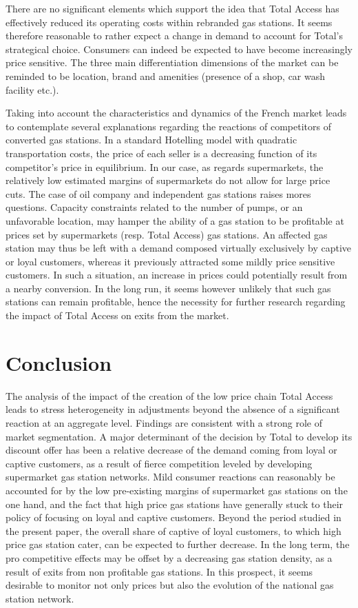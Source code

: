 \documentclass[english]{article}
\begin{document}
There are no significant elements which support the idea that Total Access has effectively reduced its operating costs within rebranded gas stations. It seems therefore reasonable to rather expect a change in demand to account for Total's strategical choice. Consumers can indeed be expected to have become increasingly price sensitive. The three main differentiation dimensions of the market can be reminded to be location, brand and amenities (presence of a shop, car wash facility etc.).

Taking into account the characteristics and dynamics of the French market leads to contemplate several explanations regarding the reactions of competitors of converted gas stations. In a standard Hotelling model with quadratic transportation costs, the price of each seller is a decreasing function of its competitor's price in equilibrium. In our case, as regards supermarkets, the relatively low estimated margins of supermarkets do not allow for large price cuts. The case of oil company and independent gas stations raises mores questions. Capacity constraints related to the number of pumps, or an unfavorable location, may hamper the ability of a gas station to be profitable at prices set by supermarkets (resp. Total Access) gas stations. An affected gas station may thus be left with a demand composed virtually exclusively by captive or loyal customers, whereas it previously attracted some mildly price sensitive customers. In such a situation, an increase in prices could potentially result from a nearby conversion. In the long run, it seems however unlikely that such gas stations can remain profitable, hence the necessity for further research regarding the impact of Total Access on exits from the market.

\section{Conclusion}

The analysis of the impact of the creation of the low price chain Total Access leads to stress heterogeneity in adjustments beyond the absence of a significant reaction at an aggregate level. Findings are consistent with a strong role of market segmentation. A major determinant of the decision by Total to develop its discount offer has been a relative decrease of the demand coming from loyal or captive customers, as a result of fierce competition leveled by developing supermarket gas station networks. Mild consumer reactions can reasonably be accounted for by the low pre-existing margins of supermarket gas stations on the one hand, and the fact that high price gas stations have generally stuck to their policy of focusing on loyal and captive customers.
Beyond the period studied in the present paper, the overall share of captive of loyal customers, to which high price gas station cater, can be expected to further decrease. In the long term, the pro competitive effects may be offset by a decreasing gas station density, as a result of exits from non profitable gas stations. In this prospect, it seems desirable to monitor not only prices but also the evolution of the national gas station network.
\end{document}
